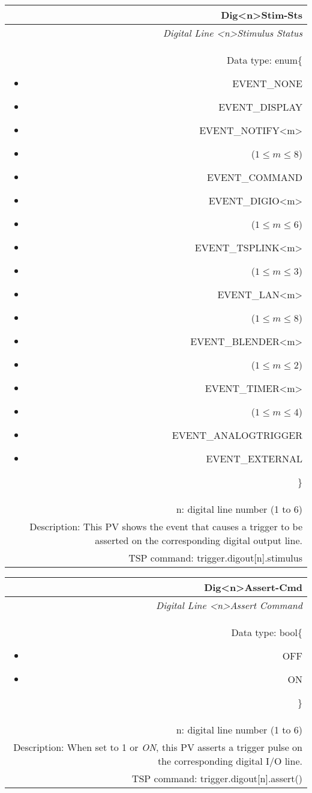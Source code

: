 \documentclass[openany]{article}
\begin{document}
		\begin{tabular}{N}
			\hline
			\bfseries Dig{\textless n\textgreater}Stim-Sts\label{pv:digstim-sts} \\ \hline
			\emph{Digital Line \textless n\textgreater Stimulus Status} \\
			Data type: enum\{\begin{itemize}[noitemsep]
				\small
				\item[] EVENT\_NONE
				\item[] EVENT\_DISPLAY
				\item[] EVENT\_NOTIFY\textless m\textgreater
				\item[] ($1\leq m\leq 8$)
				\item[] EVENT\_COMMAND
				\item[] EVENT\_DIGIO\textless m\textgreater
				\item[] ($1\leq m\leq 6$)
				\item[] EVENT\_TSPLINK\textless m\textgreater
				\item[] ($1\leq m\leq 3$)
				\item[] EVENT\_LAN\textless m\textgreater
				\item[] ($1\leq m\leq 8$)
				\item[] EVENT\_BLENDER\textless m\textgreater 
				\item[] ($1\leq m\leq 2$)
				\item[] EVENT\_TIMER\textless m\textgreater
				\item[] ($1\leq m\leq 4$)
				\item[] EVENT\_ANALOGTRIGGER
				\item[] EVENT\_EXTERNAL
			\end{itemize}\} \\
			n: digital line number (1 to 6) \\
			Description: This PV shows the event that causes a trigger to be asserted on the corresponding digital output line. \\
			TSP command: trigger.digout[n].stimulus
		\end{tabular}

		\begin{tabular}{N}
			\hline
			\bfseries Dig{\textless n\textgreater}Assert-Cmd\label{pv:digassert-cmd} \\ \hline
			\emph{Digital Line \textless n\textgreater Assert Command} \\
			Data type: bool\{\begin{itemize}[noitemsep]
				\small
				\item[] OFF
				\item[] ON
			\end{itemize}\} \\
			n: digital line number (1 to 6) \\
			Description: When set to 1 or \emph{ON}, this PV asserts a trigger pulse on the corresponding digital I/O line. \\
			TSP command: trigger.digout[n].assert()
		\end{tabular}
\end{document}
